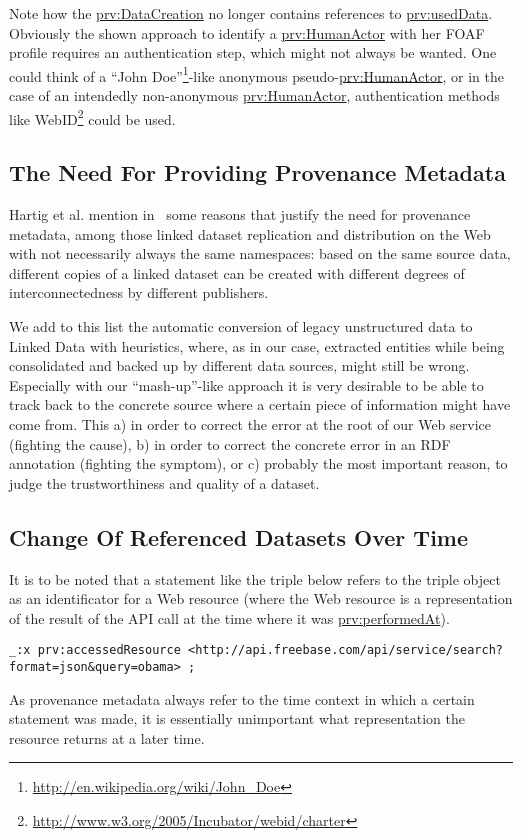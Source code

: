 \documentclass{acm_proc_article-sp}
\begin{document}
Note how the \url{prv:DataCreation} no longer contains references to \url{prv:usedData}. Obviously the shown approach to identify a \url{prv:HumanActor} with her FOAF profile requires an authentication step, which might not always be wanted. One could think of a ``John Doe''\footnote{\url{http://en.wikipedia.org/wiki/John_Doe}}-like anonymous pseudo-\url{prv:HumanActor}, or in the case of an intendedly non-anonymous \url{prv:HumanActor}, authentication methods like WebID\footnote{\url{http://www.w3.org/2005/Incubator/webid/charter}} could be used.

\subsection{The Need For Providing Provenance Metadata}
Hartig et al. mention in~\cite{ipaw10:olaf} some reasons that justify the need for provenance metadata, among those linked dataset replication and distribution on the Web with not necessarily always the same namespaces: based on the same source data, different copies of a linked dataset can be created with different degrees of interconnectedness by different publishers.

We add to this list the automatic conversion of legacy unstructured data to Linked Data with heuristics, where, as in our case, extracted entities while being consolidated and backed up by different data sources, might still be wrong. Especially with our ``mash-up''-like approach it is very desirable to be able to track back to the concrete source where a certain piece of information might have come from. This a) in order to correct the error at the root of our Web service (fighting the cause), b) in order to correct the concrete error in an RDF annotation (fighting the symptom), or c) probably the most important reason, to judge the trustworthiness and quality of a dataset.


\subsection{Change Of Referenced Datasets Over Time}\label{sec:change}
It is to be noted that a statement like the triple below refers to the triple object as an identificator for a Web resource (where the Web resource is a representation of the result of the API call at the time where it was \url{prv:performedAt}).
\begin{lstlisting}
_:x prv:accessedResource <http://api.freebase.com/api/service/search?format=json&query=obama> ;
\end{lstlisting}
As provenance metadata always refer to the time context in which a certain statement was made, it is essentially unimportant what representation the resource returns at a later time.
\end{document}
